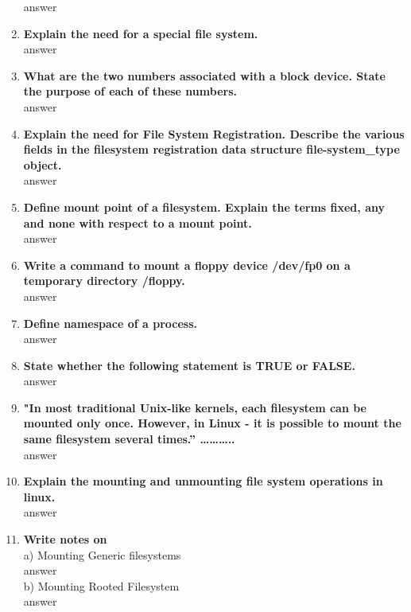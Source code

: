 \documentclass[a4paper,12pt]{article}
\begin{document}
\begin{flushleft}
\begin{enumerate}
{\color{red}answer}\\
\item \textbf{  Explain the need for a special file system.}\\
{\color{red}answer}\\
\item \textbf{  What are the two numbers associated with a block device. State the purpose of each of these numbers.}\\
{\color{red}answer}\\
\item \textbf{  Explain the need for File System Registration. Describe the various fields in the filesystem registration data structure file-system\_type object.}\\
{\color{red}answer}\\
\item \textbf{  Define mount point of a filesystem. Explain the terms fixed, any and none with respect to a mount point.}\\
{\color{red}answer}\\
\item \textbf{  Write a command to mount a floppy device /dev/fp0 on a temporary directory /floppy.}\\
{\color{red}answer}\\
\item \textbf{  Define namespace of a process.}\\
{\color{red}answer}\\
\item \textbf{  State whether the following statement is TRUE or FALSE.}\\
{\color{red}answer}\\
\item \textbf{ "In most traditional Unix-like kernels, each filesystem can be mounted only once. However, in Linux - it is possible to mount the same filesystem several times.” ………..}\\
{\color{red}answer}\\
\item \textbf{  Explain the mounting and unmounting file system operations in linux.}\\
{\color{red}answer}\\
\item \textbf{  Write notes on}\\
a) Mounting Generic filesystems\\{\color{red}answer}\\
b) Mounting Rooted Filesystem\\{\color{red}answer}\\

\end{enumerate}
\end{flushleft}
\end{document}
